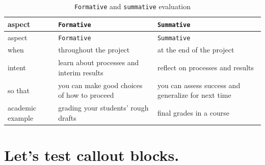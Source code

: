 \documentclass[
  letterpaper,
]{report}
\begin{document}
\begin{ecswide}

\begin{longtable}[]{@{}
  >{\raggedright\arraybackslash}p{}
  >{\raggedright\arraybackslash}p{}
  >{\raggedright\arraybackslash}p{}@{}}
\caption{\texttt{Formative} and \texttt{summative}
evaluation}\label{tbl-form}\tabularnewline
\toprule\noalign{}
\begin{minipage}[b]{\linewidth}\raggedright
aspect
\end{minipage} & \begin{minipage}[b]{\linewidth}\raggedright
\texttt{Formative}
\end{minipage} & \begin{minipage}[b]{\linewidth}\raggedright
\texttt{Summative}
\end{minipage} \\
\midrule\noalign{}
\endfirsthead
\toprule\noalign{}
\begin{minipage}[b]{\linewidth}\raggedright
aspect
\end{minipage} & \begin{minipage}[b]{\linewidth}\raggedright
\texttt{Formative}
\end{minipage} & \begin{minipage}[b]{\linewidth}\raggedright
\texttt{Summative}
\end{minipage} \\
\midrule\noalign{}
\endhead
\bottomrule\noalign{}
\endlastfoot
when & throughout the project & at the end of the project \\
intent & learn about processes and interim results & reflect on
processes and results \\
so that & you can make good choices of how to proceed & you can assess
success and generalize for next time \\
academic example & grading your students' rough drafts & final grades in
a course \\
\end{longtable}

\end{ecswide}

\section{Let's test callout blocks.}\label{lets-test-callout-blocks.}
\end{document}
